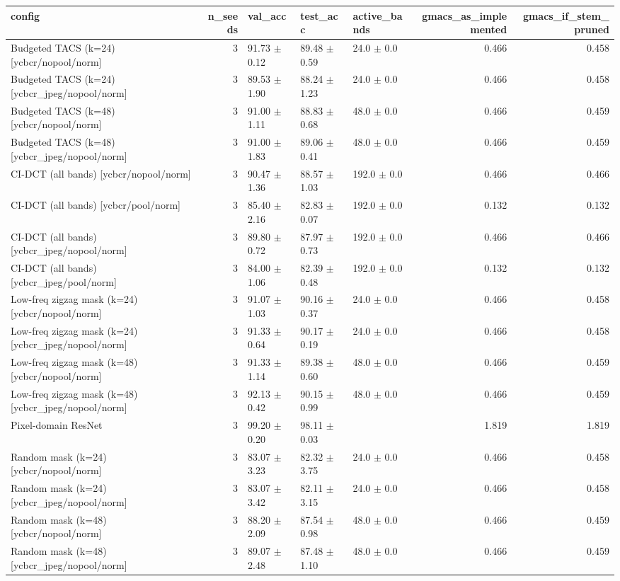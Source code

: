 \begin{tabular}{lrlllrr}
\toprule
config & n_seeds & val_acc & test_acc & active_bands & gmacs_as_implemented & gmacs_if_stem_pruned \\
\midrule
Budgeted TACS (k=24) [ycbcr/nopool/norm] & 3 & 91.73 $\pm$ 0.12 & 89.48 $\pm$ 0.59 & 24.0 $\pm$ 0.0 & 0.466 & 0.458 \\
Budgeted TACS (k=24) [ycbcr_jpeg/nopool/norm] & 3 & 89.53 $\pm$ 1.90 & 88.24 $\pm$ 1.23 & 24.0 $\pm$ 0.0 & 0.466 & 0.458 \\
Budgeted TACS (k=48) [ycbcr/nopool/norm] & 3 & 91.00 $\pm$ 1.11 & 88.83 $\pm$ 0.68 & 48.0 $\pm$ 0.0 & 0.466 & 0.459 \\
Budgeted TACS (k=48) [ycbcr_jpeg/nopool/norm] & 3 & 91.00 $\pm$ 1.83 & 89.06 $\pm$ 0.41 & 48.0 $\pm$ 0.0 & 0.466 & 0.459 \\
CI-DCT (all bands) [ycbcr/nopool/norm] & 3 & 90.47 $\pm$ 1.36 & 88.57 $\pm$ 1.03 & 192.0 $\pm$ 0.0 & 0.466 & 0.466 \\
CI-DCT (all bands) [ycbcr/pool/norm] & 3 & 85.40 $\pm$ 2.16 & 82.83 $\pm$ 0.07 & 192.0 $\pm$ 0.0 & 0.132 & 0.132 \\
CI-DCT (all bands) [ycbcr_jpeg/nopool/norm] & 3 & 89.80 $\pm$ 0.72 & 87.97 $\pm$ 0.73 & 192.0 $\pm$ 0.0 & 0.466 & 0.466 \\
CI-DCT (all bands) [ycbcr_jpeg/pool/norm] & 3 & 84.00 $\pm$ 1.06 & 82.39 $\pm$ 0.48 & 192.0 $\pm$ 0.0 & 0.132 & 0.132 \\
Low-freq zigzag mask (k=24) [ycbcr/nopool/norm] & 3 & 91.07 $\pm$ 1.03 & 90.16 $\pm$ 0.37 & 24.0 $\pm$ 0.0 & 0.466 & 0.458 \\
Low-freq zigzag mask (k=24) [ycbcr_jpeg/nopool/norm] & 3 & 91.33 $\pm$ 0.64 & 90.17 $\pm$ 0.19 & 24.0 $\pm$ 0.0 & 0.466 & 0.458 \\
Low-freq zigzag mask (k=48) [ycbcr/nopool/norm] & 3 & 91.33 $\pm$ 1.14 & 89.38 $\pm$ 0.60 & 48.0 $\pm$ 0.0 & 0.466 & 0.459 \\
Low-freq zigzag mask (k=48) [ycbcr_jpeg/nopool/norm] & 3 & 92.13 $\pm$ 0.42 & 90.15 $\pm$ 0.99 & 48.0 $\pm$ 0.0 & 0.466 & 0.459 \\
Pixel-domain ResNet & 3 & 99.20 $\pm$ 0.20 & 98.11 $\pm$ 0.03 &  & 1.819 & 1.819 \\
Random mask (k=24) [ycbcr/nopool/norm] & 3 & 83.07 $\pm$ 3.23 & 82.32 $\pm$ 3.75 & 24.0 $\pm$ 0.0 & 0.466 & 0.458 \\
Random mask (k=24) [ycbcr_jpeg/nopool/norm] & 3 & 83.07 $\pm$ 3.42 & 82.11 $\pm$ 3.15 & 24.0 $\pm$ 0.0 & 0.466 & 0.458 \\
Random mask (k=48) [ycbcr/nopool/norm] & 3 & 88.20 $\pm$ 2.09 & 87.54 $\pm$ 0.98 & 48.0 $\pm$ 0.0 & 0.466 & 0.459 \\
Random mask (k=48) [ycbcr_jpeg/nopool/norm] & 3 & 89.07 $\pm$ 2.48 & 87.48 $\pm$ 1.10 & 48.0 $\pm$ 0.0 & 0.466 & 0.459 \\
\bottomrule
\end{tabular}

